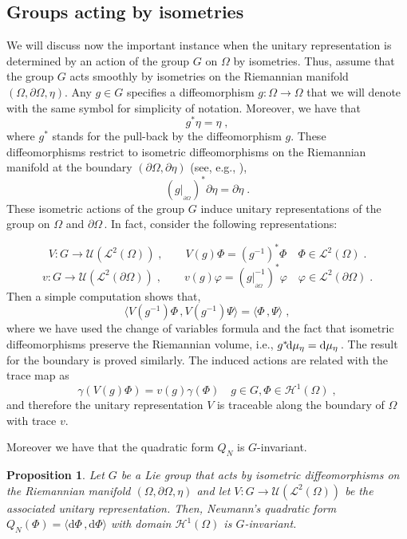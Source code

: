 \documentclass[a4paper,12pt]{amsart}
\newcommand{\scalar}[2]{\langle#1\,,#2\rangle}
\renewcommand{\H}{\mathcal{H}}
\renewcommand{\L}{\mathcal{L}}
\renewcommand{\d}{\mathrm{d}}
\newcommand{\pO}{{\partial \Omega}}
\newcommand{\1}{\mathbb{I}}
\newtheorem{proposition}[theorem]{Proposition}
\numberwithin{equation}{section}
\numberwithin{theorem}{section}
\begin{document}
\subsection{Groups acting by isometries}

We will discuss now the important instance when the unitary representation is determined by an action of the group $G$ on $\Omega$ by isometries.
Thus, assume that the group $G$ acts smoothly by isometries on the Riemannian manifold $(\Omega,\pO,\eta)$. 
Any $g\in G$ specifies a diffeomorphism $g:\Omega\to\Omega$ that we will denote with the same symbol for simplicity of notation. 
Moreover, we have that $$g^*\eta=\eta\;,$$ where $g^*$ stands for the pull-back by the diffeomorphism $g$. 
These diffeomorphisms restrict to isometric diffeomorphisms on the Riemannian manifold at the boundary $(\pO,\partial\eta)$
(see, e.g., \cite[Lemma 8.2.4]{marsden01}), 
$$
(g|_{_{\pO}})^*\partial\eta=\partial\eta\;.
$$ 
These isometric actions of the group $G$ induce unitary representations of the group on $\Omega$ and $\pO$\,.
In fact, consider the following representations:

\begin{equation*}
V\colon G\to\mathcal{U}(\L^2(\Omega))\;, \qquad V(g)\Phi=(g^{-1})^*\Phi\quad \Phi\in\L^2(\Omega)\;.
\end{equation*}
\begin{equation*}
v\colon G\to\mathcal{U}(\L^2(\pO))\;, \qquad
v (g)\varphi=(g|_{_{\pO}}^{-1})^*\varphi\quad \varphi\in\L^2(\pO)\;.
\end{equation*}
Then a simple computation shows that,
$$
\scalar{V(g^{-1})\Phi}{V(g^{-1})\Psi} =\scalar{\Phi}{\Psi}\;,
$$
where we have used the change of variables formula and the fact that isometric diffeomorphisms preserve the Riemannian volume, 
i.e., $g^*\negthinspace\d\mu_\eta=\d\mu_{\eta}$\,. The result for the boundary is proved similarly. 
The induced actions are related with the trace map as
$$
\gamma(V(g)\Phi)=v (g)\gamma(\Phi)\quad g\in G, \Phi\in\H^1(\Omega)\;,
$$
and therefore the unitary representation $V$ is traceable along the boundary of $\Omega$ with trace $v$.

Moreover we have that the quadratic form $Q_N$ is $G$-invariant.

\begin{proposition}\label{prop:dphiinvariant}
Let $G$ be a Lie group that acts by isometric diffeomorphisms on the Riemannian manifold 
$(\Omega,\pO,\eta)$ and let $V:G\to \mathcal{U}(\L^2(\Omega))$ be the associated unitary representation. 
Then, Neumann's quadratic form $Q_N (\Phi) = \scalar{\d\Phi}{\d\Phi}$ with domain $\H^1(\Omega)$ is $G$-invariant.
\end{proposition}
\end{document}
